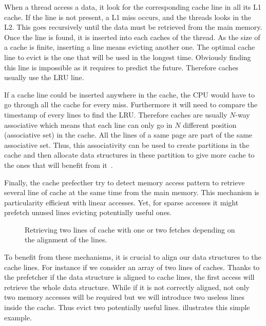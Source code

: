 When a thread access a data, it look for the corresponding cache line in all its L1 cache.
If the line is not present, a L1 miss occurs, and the threads looks in the L2.
This goes recursively until the data must be retrieved from the main memory.
Once the line is found, it is inserted into each caches of the thread.
As the size of a cache is finite, inserting a line means evicting another one.
The optimal cache line to evict is the one that will be used in the longest time.
Obviously finding this line is impossible as it requires to predict the future.
Therefore caches usually use the \acrfull{LRU} line.

If a cache line could be inserted anywhere in the cache, the \gls{CPU} would have to go through all the cache for every miss.
Furthermore it will need to compare the timestamp of every lines to find the \gls{LRU}.
Therefore caches are usually $N$-way associative which means that each line can only go in $N$ different position (associative set) in the cache.
All the lines of a same page are part of the same associative set.
Thus, this associativity can be used to create partitions in the cache and then allocate data structures in these partition to give more cache to the ones that will benefit from it~\cite{Perarnau11Controlling}.

Finally, the cache prefecther try to detect memory access pattern to retrieve several line of cache at the same time from the main memory.
This mechanism is particularity efficient with linear accesses.
Yet, for sparse accesses it might prefetch unused lines evicting potentially useful ones.

\begin{figure}[htb]
    \centering
    
    \caption[Example of Bad alignment.]{Retrieving two lines of cache with one or two fetches depending on the alignment of the lines.}
    \label{fig:bad-align}
\end{figure}

To benefit from these mechanisms, it is crucial to align our data structures to the cache lines.
For instance if we consider an array of two lines of caches.
Thanks to the prefetcher if the data structure is aligned to cache lines, the first access will retrieve the whole data structure.
While if it is not correctly aligned, not only two memory accesses will be required but we will introduce two useless lines inside the cache.
Thus evict two potentially useful lines.
 illustrates this simple example.

